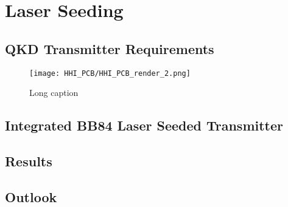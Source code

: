 %
%
\graphicspath{{./chapters/chapter06/fig06/}}

\let\textcircled=\pgftextcircled
\chapter{Laser Seeding}
\label{chap:laser-seeding}

\section{QKD Transmitter Requirements}
\label{sec:sec06}

\begin{figure}[tbp]
	\texttt{[image: HHI\_PCB/HHI\_PCB\_render\_2.png]}
	\caption[Short caption]{Long caption}
	\label{fig:hhi_pcb}
\end{figure}

\section{Integrated BB84 Laser Seeded Transmitter}

\section{Results}

\section{Outlook}


